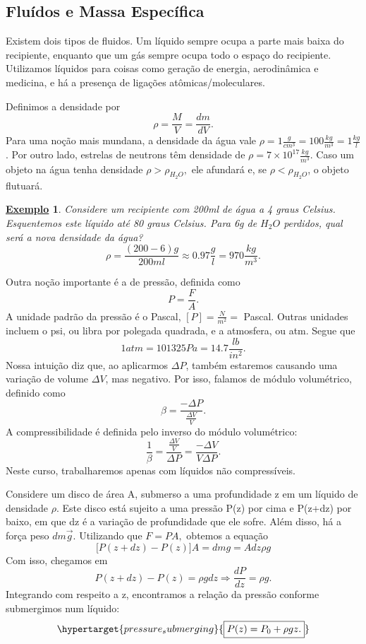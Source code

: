 \documentclass{article}
\newtheorem{example}{\underline{Exemplo}}
\begin{document}
\subsection{Fluídos e Massa Específica}
Existem dois tipos de fluidos. Um líquido sempre ocupa a parte mais baixa do recipiente, enquanto que um gás 
sempre ocupa todo o espaço do recipiente. Utilizamos líquidos para coisas como geração de energia, aerodinâmica e medicina,
e há a presença de ligações atômicas/moleculares. 

Definimos a densidade por 
\[
  \rho = \frac{M}{V} = \frac{dm}{dV}.
\]
Para uma noção mais mundana, a densidade da água vale \(\rho = 1 \frac{g}{cm^{3}} = 100 \frac{kg}{m^{3}} = 1 \frac{kg}{l}\). Por outro lado, estrelas de neutrons 
têm densidade de \(\rho = 7\times 10^{17}\frac{kg}{m^{3}}\). Caso um objeto na água tenha densidade \(\rho > \rho_{H_{2}O},\) ele afundará e, se
\(\rho < \rho_{H_{2}O}\), o objeto flutuará.
\begin{example}
  Considere um recipiente com 200ml de água a 4 graus Celsius. Esquentemos este líquido até 80 graus Celsius.
  Para 6g de \(H_{2}O\) perdidos, qual será a nova densidade da água? 
  \[
    \rho = \frac{(200 - 6)g}{200ml}\approx 0.97 \frac{g}{l} = 970 \frac{kg}{m^{3}}.
  \]
\end{example}
Outra noção importante é a de pressão, definida como 
\[
  P = \frac{F}{A}.
\]
A unidade padrão da pressão é o Pascal, \([P]= \frac{N}{m^{2}} =\) Pascal. Outras unidades incluem o psi, 
ou libra por polegada quadrada, e a atmosfera, ou atm. Segue que 
\[
  1atm = 101325 Pa = 14.7 \frac{lb}{in^{2}}.
\]
Nossa intuição diz que, ao aplicarmos \(\Delta P\), também estaremos causando uma variação de volume \(\Delta V\), mas negativo.
Por isso, falamos de módulo volumétrico, definido como 
\[
  \beta = \frac{-\Delta P}{\frac{\Delta V}{V}}.
\]
A compressibilidade é definida pelo inverso do módulo volumétrico: 
\[
  \frac{1}{\beta } = \frac{\frac{\Delta V}{V}}{\Delta P} = \frac{-\Delta V}{V\Delta P}.
\]
Neste curso, trabalharemos apenas com líquidos não compressíveis.

Considere um disco de área A, submerso a uma profundidade z em um líquido de densidade \(\rho \).
Este disco está sujeito a uma pressão P(z) por cima e P(z+dz) por baixo, em que dz é a variação de profundidade que ele sofre.
Além disso, há a força peso \(dm \vec{g}\). Utilizando que \(F = P A,\) obtemos a equação 
\[
  \biggl[P(z+dz) - P(z)\biggr]A = dmg = Adz\rho g
\]
Com isso, chegamos em 
\[
  P(z+dz) - P(z) = \rho g dz \Rightarrow \frac{dP}{dz} = \rho g.
\]
Integrando com respeito a z, encontramos a relação da pressão conforme submergimos num líquido: 
\[
  \hypertarget{pressure_submerging}{\boxed{P(z) = P_{0}+\rho gz.}}
\]
\newpage
\end{document}
